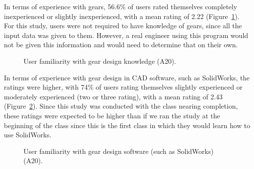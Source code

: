 \begin{doublespace}
In terms of experience with gears, 56.6\% of users rated themselves completely inexperienced or slightly inexperienced, with a mean rating of 2.22 (Figure~\ref{fig:gear_design}). For this study, users were not required to have knowledge of gears, since all the input data was given to them. However, a real engineer using this program would not be given this information and would need to determine that on their own.

\begin{figure}
    \centering
    \caption{User familiarity with gear design knowledge (A20).}
    \label{fig:gear_design}
\end{figure}

In terms of experience with gear design in CAD software, such as SolidWorks, the ratings were higher, with 74\% of users rating themselves slightly experienced or moderately experienced (two or three rating), with a mean rating of 2.43 (Figure~\ref{fig:gear_sw}). Since this study was conducted with the class nearing completion, these ratings were expected to be higher than if we ran the study at the beginning of the class since this is the first class in which they would learn how to use SolidWorks.

\begin{figure}
    \centering
    
    \caption{User familiarity with gear design software (such as SolidWorks) (A20).}
    \label{fig:gear_sw}
\end{figure}


\end{doublespace}
